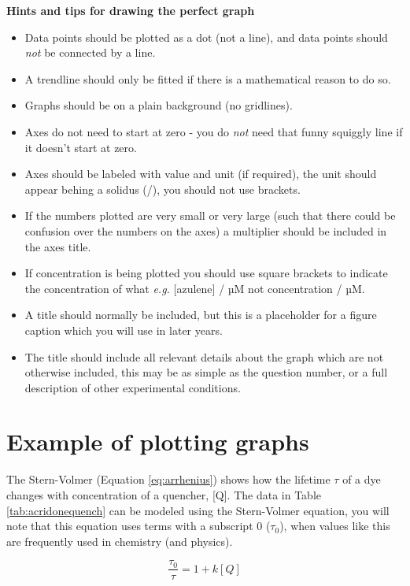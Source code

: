 \documentclass[
]{book}
\providecommand{\tightlist}{%
  \setlength{\itemsep}{0pt}\setlength{\parskip}{0pt}}
\begin{document}
\textbf{Hints and tips for drawing the perfect graph}

\begin{itemize}
\tightlist
\item
  Data points should be plotted as a dot (not a line), and data points should \emph{not} be connected by a line.
\item
  A trendline should only be fitted if there is a mathematical reason to do so.
\item
  Graphs should be on a plain background (no gridlines).
\item
  Axes do not need to start at zero - you do \emph{not} need that funny squiggly line if it doesn't start at zero.
\item
  Axes should be labeled with value and unit (if required), the unit should appear behing a solidus (/), you should not use brackets.
\item
  If the numbers plotted are very small or very large (such that there could be confusion over the numbers on the axes) a multiplier should be included in the axes title.
\item
  If concentration is being plotted you should use square brackets to indicate the concentration of what \emph{e.g.} {[}azulene{]} / µM not concentration / µM.
\item
  A title should normally be included, but this is a placeholder for a figure caption which you will use in later years.
\item
  The title should include all relevant details about the graph which are not otherwise included, this may be as simple as the question number, or a full description of other experimental conditions.
\end{itemize}

\hypertarget{subsec:example}{%
\section{Example of plotting graphs}\label{subsec:example}}

The Stern-Volmer (Equation \eqref{eq:arrhenius}) shows how the lifetime \(\tau\) of a dye changes with concentration of a quencher, {[}Q{]}. The data in Table \ref{tab:acridonequench} can be modeled using the Stern-Volmer equation, you will note that this equation uses terms with a subscript 0 (\(\tau_0\)), when values like this are frequently used in chemistry (and physics).

\begin{equation}
\frac{\tau_0}{\tau}=1+k[Q]
\label{eq:sternvolmer}
\end{equation}
\end{document}

